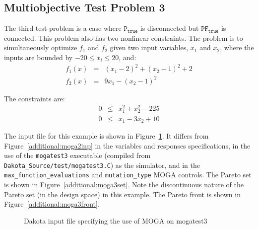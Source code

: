 \subsection{Multiobjective Test Problem 3}\label{additional:multiobjective:problem3}

The third test problem is a case where $\mathtt{P_{true}}$ is
disconnected but $\mathtt{PF_{true}}$ is connected. 
This problem also has two
nonlinear constraints. The problem is to simultaneously optimize
$f_1$ and $f_2$ given two input variables, $x_1$ and $x_2$,
where the inputs are bounded by $-20 \leq x_{i} \leq 20$, and:
\begin{eqnarray*}
f_1(x) &=& (x_1-2)^2+(x_2-1)^2+2 \\
f_2(x) &=& 9x_1-(x_2-1)^2
\end{eqnarray*}

The constraints are:
\begin{eqnarray*}
0 &\leq& x_1^2+x_2^2-225 \\
0 &\leq& x_1-3x_2+10
\end{eqnarray*}

The input file for this example is shown in
Figure~\ref{additional:moga3inp}. It differs from
Figure~\ref{additional:moga2inp} in the variables and responses
specifications, in the use of the \texttt{mogatest3} executable
(compiled from \texttt{Dakota\_Source/test/mogatest3.C}) as the simulator, and
in the \texttt{max\_function\_evaluations} and \texttt{mutation\_type}
MOGA controls. The Pareto set is shown in
Figure~\ref{additional:moga3set}. Note the discontinuous nature of the
Pareto set (in the design space) in this example. The Pareto front is
shown in Figure~\ref{additional:moga3front}.

\begin{figure}
  \centering
  \begin{bigbox}
    \begin{small}
    \end{small}
  \end{bigbox}
  \caption{Dakota input file specifying the use of MOGA on mogatest3}
  \label{additional:moga3inp}
\end{figure}

